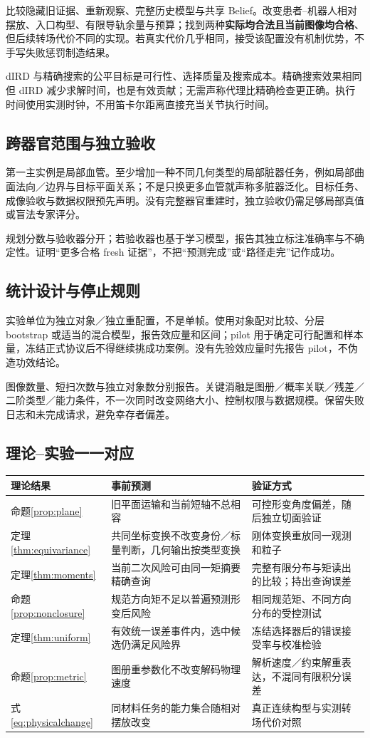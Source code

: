 \documentclass[UTF8,fontset=fandol,11pt,a4paper]{ctexart}
\theoremstyle{plain}
\theoremstyle{definition}
\theoremstyle{remark}
\numberwithin{equation}{section}
\begin{document}
比较隐藏旧证据、重新观察、完整历史模型与共享 Belief。改变患者--机器人相对摆放、入口构型、有限导轨余量与预算；找到两种\textbf{实际均合法且当前图像均合格}、但后续转场代价不同的实现。若真实代价几乎相同，接受该配置没有机制优势，不手写失败惩罚制造结果。

dIRD 与精确搜索的公平目标是可行性、选择质量及搜索成本。精确搜索效果相同但 dIRD 减少求解时间，也是有效贡献；无需声称代理比精确检查更正确。执行时间使用实测时钟，不用笛卡尔距离直接充当关节执行时间。

\subsection{跨器官范围与独立验收}
第一主实例是局部血管。至少增加一种不同几何类型的局部脏器任务，例如局部曲面法向／边界与目标平面关系；不是只换更多血管就声称多脏器泛化。目标任务、成像验收与数据权限预先声明。没有完整器官重建时，独立验收仍需足够局部真值或盲法专家评分。

规划分数与验收器分开；若验收器也基于学习模型，报告其独立标注准确率与不确定性。证明“更多合格 fresh 证据”，不把“预测完成”或“路径走完”记作成功。

\subsection{统计设计与停止规则}
实验单位为独立对象／独立重配置，不是单帧。使用对象配对比较、分层 bootstrap 或适当的混合模型，报告效应量和区间；pilot 用于确定可行配置和样本量，冻结正式协议后不得继续挑成功案例。没有先验效应量时先报告 pilot，不伪造功效结论。

图像数量、短扫次数与独立对象数分别报告。关键消融是图册／概率关联／残差／二阶类型／能力条件，不一次同时改变网络大小、控制权限与数据规模。保留失败日志和未完成请求，避免幸存者偏差。

\subsection{理论--实验一一对应}
\begin{longtable}{P{38mm}P{55mm}P{58mm}}
\toprule 理论结果 & 事前预测 & 验证方式\\\midrule\endhead
命题\ref{prop:plane} & 旧平面运输和当前短轴不总相容 & 可控形变角度偏差，随后独立切面验证\\
定理\ref{thm:equivariance} & 共同坐标变换不改变身份／标量判断，几何输出按类型变换 & 刚体变换重放同一观测和粒子\\
定理\ref{thm:moments} & 当前二次风险可由同一矩摘要精确查询 & 完整有限分布与矩读出的比较；持出查询误差\\
命题\ref{prop:nonclosure} & 规范方向矩不足以普遍预测形变后风险 & 相同规范矩、不同方向分布的受控测试\\
定理\ref{thm:uniform} & 有效统一误差事件内，选中候选仍满足风险界 & 冻结选择器后的错误接受率与校准检验\\
命题\ref{prop:metric} & 图册重参数化不改变解码物理速度 & 解析速度／约束解重表达，不混同有限积分误差\\
式\eqref{eq:physicalchange} & 同材料任务的能力集合随相对摆放改变 & 真正连续构型与实测转场代价对照\\\bottomrule
\end{longtable}
\end{document}
